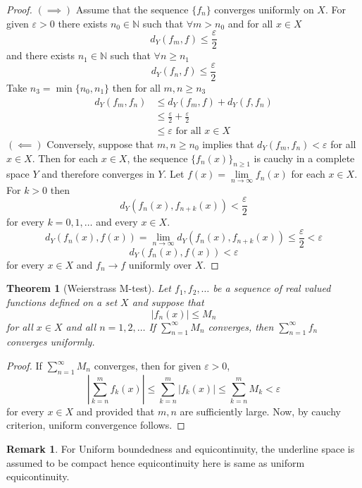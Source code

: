 \documentclass[12pt,reqno]{amsart}
\theoremstyle{plain}
\newtheorem{thm}{Theorem}
\theoremstyle{definition}
\newtheorem{rem}{Remark}
\begin{document}
\begin{proof}
    $(\implies)$ Assume that the sequence $\{f_n\}$ converges uniformly on $X$. For given $\varepsilon > 0$ there exists $n_0 \in \mathbb{N}$ such that $\forall m > n_0$ and for all $x \in X$
    $$ d_Y(f_m,f) \leq \frac{\varepsilon}{2} $$ and there exists $n_1 \in \mathbb{N}$ such that $\forall n \geq n_1$ 
    $$ d_Y(f_n,f) \leq \frac{\varepsilon}{2} $$
    Take $ n_3 = \min\{n_0,n_1\}$ then for all $m,n \geq n_3$
    \begin{align*}
        d_Y(f_m,f_n) &\leq d_Y(f_m, f) + d_Y(f,f_n)\\
        &\leq \frac{\varepsilon}{2} + \frac{\varepsilon}{2}\\
        &\leq \varepsilon \text{ for all } x \in X      
    \end{align*}
$(\impliedby)$ Conversely, suppose that $m,n \geq n_0$ implies that $d_Y(f_m,f_n) < \varepsilon$ for all $x \in X$. Then for each $x \in X$, the sequence $\{f_n(x)\}_{n \geq 1}$ is cauchy in a complete space $Y$ and therefore converges in $Y$. Let $f(x) = \lim\limits_{n \to \infty}f_n(x)$ for each $x \in X$.  For $k > 0$ then
$$ d_Y(f_n(x), f_{n+k}(x)) < \frac{\varepsilon}{2}$$
for every $ k = 0,1,\dots$ and every $x \in X$. 
$$ d_Y(f_n(x),f(x)) = \lim\limits_{n \to \infty}d_Y(f_n(x), f_{n+k}(x)) \leq \frac{\varepsilon}{2} < \varepsilon$$
$$ d_Y(f_n(x),f(x)) < \varepsilon$$
for every $x \in X$ and $f_n \to f$ uniformly over $X$.
\end{proof}
\begin{thm}[Weierstrass M-test]
    Let $f_1, f_2, \dots$ be a sequence of real valued functions defined on a set $X$ and suppose that
    $$ |f_n(x)| \leq M_n$$
    for all $x \in X$ and all $n = 1,2,\dots$ If $\sum\limits_{n=1}^{\infty} M_n$ converges, then $\sum\limits_{n=1}^{\infty} f_n$ converges uniformly.
\end{thm}
\begin{proof}
    If $\sum\limits_{n=1}^{\infty} M_n$ converges, then for given $\varepsilon > 0$,
    $$ \left|\sum\limits_{k=n}^{m} f_k(x)\right| \leq \sum\limits_{k=n}^{m} \left|f_k(x)\right| \leq \sum\limits_{k=n}^{m} M_k < \varepsilon$$ 
    for every $x \in X$ and provided that $m,n$ are sufficiently large. Now, by cauchy criterion, uniform convergence follows.
\end{proof}
\begin{rem}
    For Uniform boundedness and equicontinuity, the underline space is assumed to be compact hence equicontinuity here is same as uniform equicontinuity.
\end{rem}
\end{document}
